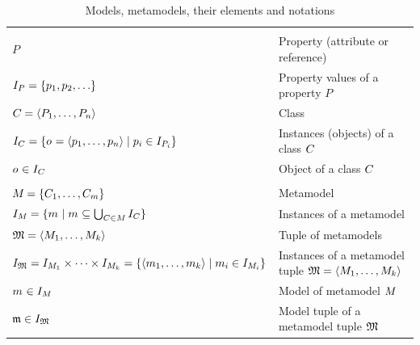 \begin{table}
    \centering
    \small
    \renewcommand{\arraystretch}{1.4}%
    \begin{tabular}{R{4.8cm} L{5cm}}
        \toprule
        \rowcolor{\headinglinecolor}
        \\
        $P$
            & Property (attribute or reference) \\
        $\instances{P} = \setted{p_1, p_2, \dots}$     
            & Property values of a property $P$ \\
        $C_{} = \langle P_1, \dots, P_n \rangle$
            & Class \\
        $I_{C_{}} = \{ o_{} = \langle p_1, \dots, p_n \rangle \mid p_i \in I_{P_i} \}$ 
            & Instances (objects) of a class $C_{}$\\
        $o_{} \in I_{C_{}}$
            & Object of a class $C_{}$ \\
        \midrule
        \rowcolor{\headinglinecolor}
        \\
        $M_{} = \{ C_{1}, \dots, C_{m} \}$
            & Metamodel\\
        $I_{M_{}} = \{ m_{} \mid m_{} \subseteq \bigcup_{C_{} \in M_{}} I_{C_{}} \}$
            & Instances of a metamodel\\
        $\mathfrak{M} = \langle M_{1}, \dots, M_{k} \rangle$
            & Tuple of metamodels\\
        $I_{\mathfrak{M}} = I_{M_{1}} \times \dots \times I_{M_{k}} = \{  \langle m_{1}, \dots, m_{k} \rangle \mid m_{i} \in I_{M_{i}} \}$
            & Instances of a metamodel tuple $\mathfrak{M} = \langle M_{1}, \dots, M_{k} \rangle$\\
        $m_{} \in I_{M_{}}$
            & Model of metamodel $M_{}$\\
        $\mathfrak{m} \in I_{\mathfrak{M}}$
            & Model tuple of a metamodel tuple $\mathfrak{M}$\\
        \bottomrule
    \end{tabular}
    \caption[Models, metamodels, their elements and notations]{Models, metamodels, their elements and notations}
    \label{tab:networks:elements}
\end{table}

